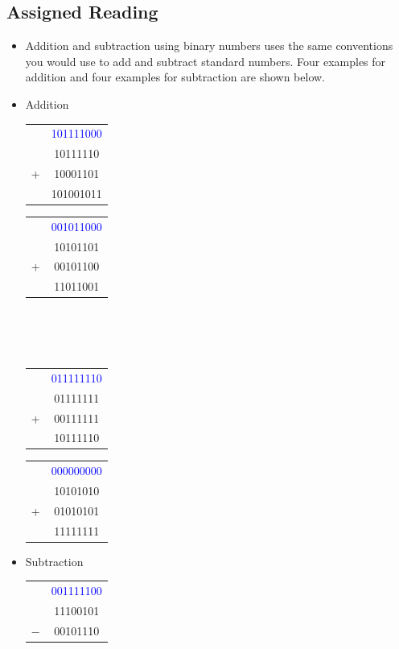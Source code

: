 \documentclass[10pt,a4paper]{article}
\begin{document}
\subsection{Assigned Reading}
\begin{itemize}
\item Addition and subtraction using binary numbers uses the same conventions you would use to add and subtract standard numbers. Four examples for addition and four examples for subtraction are shown below. 
\item Addition\\
\begin{tabular}{cc}
  & \textcolor{blue}{101111000}\\
  & 10111110\\
+ & 10001101\\
\hline
 & 101001011\\
\end{tabular}\hspace{.5cm}
\begin{tabular}{cc}
  & \textcolor{blue}{001011000}\\
  & 10101101\\
+ & 00101100\\
\hline
 & 11011001\\
\end{tabular}\\~\\~\\
\begin{tabular}{cc}
  & \textcolor{blue}{011111110}\\
  & 01111111\\
+ & 00111111\\
\hline
 & 10111110\\
\end{tabular}\hspace{.5cm}
\begin{tabular}{cc}
  & \textcolor{blue}{000000000}\\
  & 10101010\\
+ & 01010101\\
\hline
 & 11111111\\
\end{tabular}
\item Subtraction\\
\begin{tabular}{cc}
  & \textcolor{blue}{001111100}\\
  & 11100101\\
$-$ & 00101110\\

\end{tabular}
\end{itemize}
\end{document}
